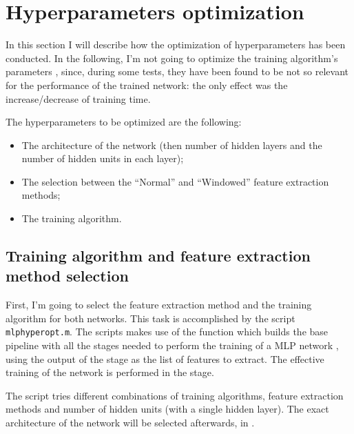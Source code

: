 \section{Hyperparameters optimization}\label{sec:mlphyperopt}

In this section I will describe how the optimization of hyperparameters has
been conducted. In the following, I'm not going to optimize the training
algorithm's parameters , since, during some tests,
they have been found to be not so relevant for the performance of the trained
network: the only effect was the increase/decrease of training time.

The hyperparameters to be optimized are the following:
\begin{itemize}
\item The architecture of the network (then number of hidden layers and the
	number of hidden units in each layer);
\item The selection between the ``Normal'' and ``Windowed'' feature extraction
	methods;
\item The training algorithm.
\end{itemize}

\subsection{Training algorithm and feature extraction meth\-od
selection}\label{subsec:mlphyperopt}

First, I'm going to select the feature extraction method and the training
algorithm for both networks. This task is accomplished by the script
\texttt{mlphyperopt.m}. The scripts makes use of the 
function which builds the base pipeline with all the stages needed to perform
the training of a MLP network , using the output of the
 stage  as the list of features
to extract. The effective training of the network is performed in the
 stage.

The script tries different combinations of training algorithms, feature
extraction methods and number of hidden units (with a single hidden layer). The
exact architecture of the network will be selected afterwards, in
.

